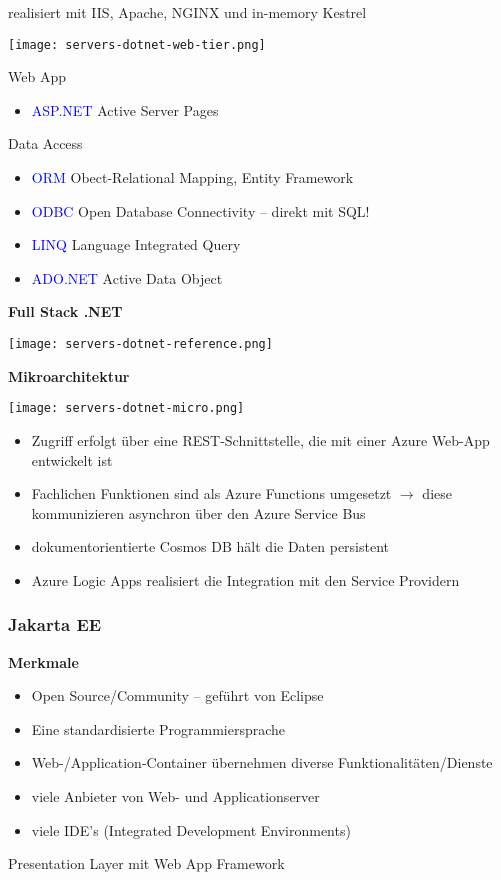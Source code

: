 realisiert mit IIS, Apache, NGINX und in-memory Kestrel

\texttt{[image: servers-dotnet-web-tier.png]}

Web App

\begin{itemize}
    \item \textcolor{blue}{ASP.NET} Active Server Pages
\end{itemize}
\vspace{10pt}
Data Access

\begin{itemize}
    \item \textcolor{blue}{ORM} Obect-Relational Mapping, Entity Framework
    \item \textcolor{blue}{ODBC} Open Database Connectivity – direkt mit SQL!
    \item \textcolor{blue}{LINQ} Language Integrated Query
    \item \textcolor{blue}{ADO.NET} Active Data Object
\end{itemize}
\vspace{10pt}
\textbf{Full Stack .NET}

\texttt{[image: servers-dotnet-reference.png]}

\textbf{Mikroarchitektur}

\texttt{[image: servers-dotnet-micro.png]}

\begin{itemize}
    \item Zugriff erfolgt über eine REST-Schnittstelle, die mit einer Azure Web-App entwickelt ist
    \item Fachlichen Funktionen sind als Azure Functions umgesetzt $\rightarrow$ diese kommunizieren asynchron über den Azure Service Bus
    \item dokumentorientierte Cosmos DB hält die Daten persistent
    \item Azure Logic Apps realisiert die Integration mit den Service Providern
\end{itemize}

\subsubsection{Jakarta EE}

\textbf{Merkmale}

\begin{itemize}
    \item Open Source/Community – geführt von Eclipse
    \item Eine standardisierte Programmiersprache
    \item Web-/Application-Container übernehmen diverse Funktionalitäten/Dienste
    \item viele Anbieter von Web- und Applicationserver
    \item viele IDE's (Integrated Development Environments)
\end{itemize}
\vspace{10pt}
Presentation Layer mit Web App Framework


